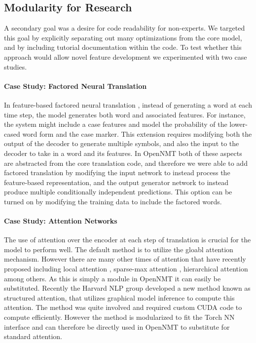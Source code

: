 \documentclass[11pt]{article}
\begin{document}
\subsection{Modularity for Research}

A secondary goal was a desire for code readability for non-experts.
We targeted this goal by explicitly separating out many optimizations
from the core model, and by including tutorial documentation within
the code. To test whether this approach would allow novel feature
development we experimented with two case studies.

\paragraph{Case Study: Factored Neural Translation}

In feature-based factored neural translation
\cite{sennrich2016linguistic}, instead of  generating a word at
each time step, the model generates both word and associated features. For
instance,  the system might include a case features and
model the probability of the lower-cased word form and the
case marker. This extension requires modifying both the output of the
decoder to generate multiple symbols, and also the input to the
decoder to take in a word and its features. In OpenNMT both of these
aspects are abstracted from the core translation code, and therefore
we were able to add factored translation by modifying the input
network to instead process the feature-based representation, and the
output generator network to instead produce multiple conditionally
independent predictions.  This option can be turned on by modifying
the training data to include the factored words.

\paragraph{Case Study: Attention Networks}

The use of attention over the encoder at each step of translation is
crucial for the model to perform well. The default method is to
utilize the gloabl attention mechanism. However
there are many other times of attention that have recently proposed
including local attention \cite{Luong2015}, sparse-max attention
\cite{martins2016softmax}, hierarchical attention
\cite{yang2016hierarchical} among others. As this is simply a module
in OpenNMT it can easily be substituted. Recently the Harvard NLP
group developed a new method known as structured attention,
that utilizes graphical model inference to compute this attention. The
method was quite involved and required custom CUDA code to compute
efficiently. However the method is modularized to fit the Torch NN
interface and can therefore be directly used in OpenNMT to substitute
for standard attention.
\end{document}
